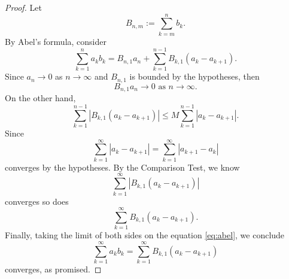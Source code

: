 \documentclass{report}
\begin{document}
\vspace{12pt}
\begin{Exercise}
\begin{proof}
Let $$B_{n,m} := \sum_{k=m}^{n}b_k.$$
By Abel's formula, consider \begin{equation}\label{eq:abel}
\sum_{k=1}^{n}a_k b_k = 
B_{n,1}a_n + \sum_{k=1}^{n-1}B_{k,1}(a_k-a_{k+1}).
\end{equation}
Since $a_n\to 0$ as $n\to\infty$ and $B_{n,1}$ is bounded by the hypotheses, then $$B_{n,1}a_n\to 0\text{ as }n\to\infty.$$
On the other hand, $$\sum_{k=1}^{n-1}\left|B_{k,1}(a_k-a_{k+1})\right| \leq
M\sum_{k=1}^{n-1}\left|a_k-a_{k+1}\right|.$$ Since $$\sum_{k=1}^{\infty}\left|a_k-a_{k+1}\right| =
\sum_{k=1}^{\infty}\left|a_{k+1}-a_k\right|$$ converges by the hypotheses. By the Comparison Test, we know $$\sum_{k=1}^{\infty}\left|B_{k,1}(a_k-a_{k+1})\right|$$ converges so does $$\sum_{k=1}^{\infty}B_{k,1}(a_k-a_{k+1}).$$
Finally, taking the limit of both sides on the equation \eqref{eq:abel}, we conclude $$\sum_{k=1}^{\infty}a_k b_k = 
\sum_{k=1}^{\infty}B_{k,1}(a_k-a_{k+1})$$ converges, as promised.
\end{proof}
\end{Exercise}
\end{document}

